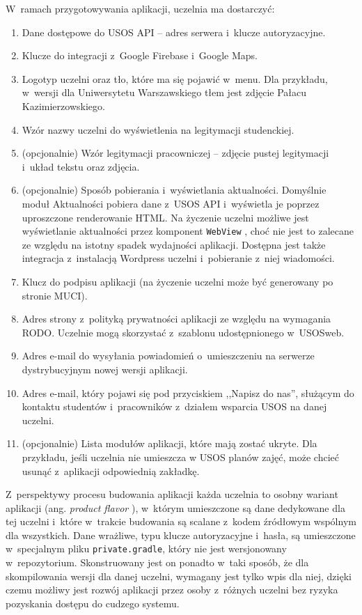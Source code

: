 \documentclass{pracamgr}
\begin{document}
W~ramach przygotowywania aplikacji, uczelnia ma dostarczyć:
\begin{enumerate}
	\item Dane dostępowe do USOS API -- adres serwera i~klucze autoryzacyjne.
	\item Klucze do integracji z~Google Firebase i~Google Maps.
	\item Logotyp uczelni oraz tło, które ma się pojawić w~menu. Dla przykładu, w~wersji dla Uniwersytetu Warszawskiego
        tłem jest zdjęcie Pałacu Kazimierzowskiego.
	\item Wzór nazwy uczelni do wyświetlenia na legitymacji studenckiej.
	\item (opcjonalnie) Wzór legitymacji pracowniczej -- zdjęcie pustej legitymacji i~układ tekstu oraz zdjęcia.
	\item (opcjonalnie) Sposób pobierania i~wyświetlania aktualności. Domyślnie moduł Aktualności pobiera dane z~USOS
        API i~wyświetla je poprzez uproszczone renderowanie HTML. Na życzenie uczelni możliwe jest wyświetlanie
        aktualności przez komponent \texttt{WebView} \cite{webview}, choć nie jest to zalecane ze względu na istotny
        spadek wydajności aplikacji. Dostępna jest także integracja z~instalacją Wordpress uczelni i~pobieranie z~niej wiadomości.
	\item Klucz do podpisu aplikacji (na życzenie uczelni może być generowany po stronie MUCI).
	\item Adres strony z~polityką prywatności aplikacji ze względu na wymagania RODO. Uczelnie mogą skorzystać z~szablonu udostępnionego w~USOSweb.
	\item Adres e-mail do wysyłania powiadomień o~umieszczeniu na serwerze dystrybucyjnym nowej wersji aplikacji.
	\item Adres e-mail, który pojawi się pod przyciskiem ,,Napisz do nas'', służącym do kontaktu studentów i~pracowników z~działem wsparcia USOS na danej uczelni.
	\item (opcjonalnie) Lista modułów aplikacji, które mają zostać ukryte. Dla przykładu, jeśli
	uczelnia nie umieszcza w USOS planów zajęć, może chcieć usunąć z~aplikacji odpowiednią
	zakładkę.
\end{enumerate}

Z~perspektywy procesu budowania aplikacji każda uczelnia to osobny wariant aplikacji 
(ang. \textit{product flavor} \cite{product-flavor}), w~którym umieszczone są dane dedykowane dla tej uczelni i~które w~trakcie
budowania są scalane z~kodem źródłowym wspólnym dla wszystkich. Dane wrażliwe, typu klucze autoryzacyjne i~hasła, są
umieszczone w~specjalnym pliku \texttt{private.gradle}, który nie jest wersjonowany w~repozytorium. Skonstruowany jest on
ponadto w~taki sposób, że dla skompilowania wersji dla danej uczelni, wymagany jest tylko wpis dla niej, dzięki czemu
możliwy jest rozwój aplikacji przez osoby z~różnych uczelni bez ryzyka pozyskania dostępu do cudzego systemu.
\end{document}
